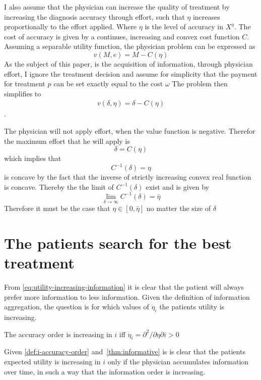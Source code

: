 \documentclass[11pt,a4paper,oneside]{article}
\begin{document}
I also assume that the physician can increase the quality of treatment by increasing the diagnosis accuracy through effort, such that \(\eta\) increases proportionally to the effort applied. Where \(\eta\) is the level of accuracy in \(X^\eta\). The cost of accuracy is given by a continues, increasing and convex cost function \(C\). Assuming a separable utility function, the physician problem can be expressed as
\[
	v(M,e)=M-C(\eta)
\]
As the subject of this paper, is the acquisition of information, through physician effort, I ignore the treatment decision and assume for simplicity that the payment for treatment \(p\) can be set exactly equal to the cost \(\omega\)  The problem then simplifies to
\begin{align}
v(\delta,\eta)=\delta-C(\eta)\label{eq:phys-utility}
\end{align}.

The physician will not apply effort, when the value function is negative. Therefor the maximum effort that he will apply is 
\[
	\delta=C(\eta)
\]
which implies that 
\[
	C^{-1}(\delta)=\eta
\]
is concave by the fact that the inverse of strictly increasing convex real function is concave. Thereby the the limit of \(C^{-1}(\delta)\) exist and is given by 
\[
	\lim_{\delta \rightarrow\infty}C^{-1}(\delta)=\bar{\eta}
\]
Therefore it must be the case that \(\eta\in[0,\bar{\eta}]\) no matter the size of \(\delta\)
\section{The patients search for the best treatment}

From \cref{eq:utility-increasing-information} it is clear that the patient will always prefer more information to less information. Given the definition of information aggregation, the question is for which values of \(\dot{\eta}_i\) the patients utility is increasing.

\begin{definition}\label{def:i-accuracy-order}
	The accuracy order is increasing in \(i\) iff \(\dot{\eta}_i=\partial^2 \big/\partial \eta \partial i>0\)
\end{definition}
 Given \cref{def:i-accuracy-order} and~\cref{thm:informative} is is clear that the patients expected utility is increasing in \(i\) only if the physician accumulates information over time, in such a way that the information order is increasing.
\end{document}
